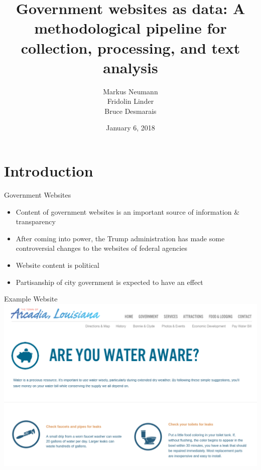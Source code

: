 \documentclass[12pt]{beamer}
\title[]{Government websites as data: A methodological pipeline for
collection, processing, and text analysis}
\author{Markus Neumann \\ Fridolin Linder \\ Bruce Desmarais}
\institute{The Pennsylvania State University}
\date{January 6, 2018}
\begin{document}
\section{Introduction}
\begin{frame}
\titlepage
\end{frame}


\begin{frame}{Government Websites}
\linespread{1.5}
{\large
	\begin{itemize}
		\item Content of government websites is an important source of information \& transparency
		\item After coming into power, the Trump administration  has made some controversial changes to the websites of federal agencies
		\item Website content is political
		\item Partisanship of city government is expected to have an effect
	\end{itemize}
	
}
\end{frame}

\begin{frame}{Example Website}
	\includegraphics[width = \linewidth]{arcadia_water.png}
\end{frame}
\end{document}
